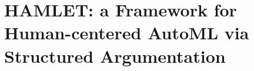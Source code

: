 \chapter{HAMLET: a Framework for Human-centered AutoML via Structured Argumentation}
\label{human-centric-chap:hamlet}




